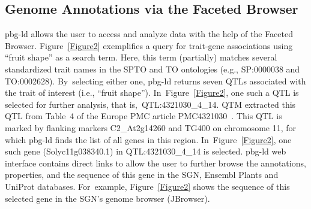 \documentclass[applsci,article,accept,moreauthors,pdftex]{Definitions/mdpi}
\begin{document}
{\subsection{Genome Annotations via the Faceted Browser}
pbg-ld %
allows the user to access and analyze data with the help of the Faceted Browser. %
Figure~\ref{Figure2} exemplifies a query for trait-gene associations using ``fruit shape'' as a search term.
Here, this term (partially) matches several standardized trait names in the SPTO and TO ontologies (e.g., SP:0000038 
and TO:0002628). %
By~selecting either one, pbg-ld returns seven QTLs associated with the trait of interest (i.e., ``fruit shape''). %
In~Figure~\ref{Figure2}, one such a QTL is selected for further analysis, that is,~QTL:4321030{\_}4{\_}14.
QTM extracted this QTL from Table~4 of the Europe PMC article %
PMC4321030~\cite{haggard2015multiple}. This QTL is marked by flanking markers C2{\_}At2g14260 and TG400 on chromosome 11, for which pbg-ld finds the list of all genes in this region. %
In~Figure~\ref{Figure2}, one such gene (Solyc11g038340.1) in QTL:4321030{\_}4{\_}14 is selected.
pbg-ld web interface contains %
direct links to allow the user to further browse the annotations, %
properties, and the sequence %
of this gene in the SGN, Ensembl Plants and UniProt databases. %
For~example, Figure~\ref{Figure2} shows %
the sequence of this selected gene in the SGN’s genome browser (JBrowser). 
%

}
\end{document}
